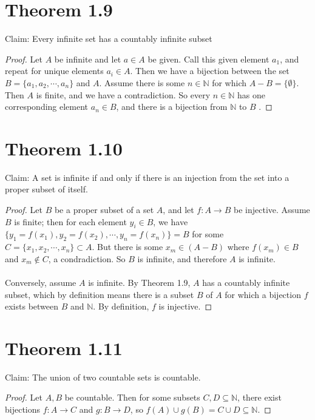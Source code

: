 \documentclass{article}
\begin{document}
\section*{Theorem 1.9}

Claim: Every infinite set has a countably infinite subset 

\begin{proof}
    Let $A$ be infinite and let $a \in A$ be given.  Call this given element 
    $a_1$, and repeat for unique elements $a_i \in A$.  Then we have a bijection 
    between the set $B = \{ a_1, a_2, \cdots, a_n \}$ and $A$.  Assume there is some 
    $n \in \mathbb{N}$ for which $A - B = \{ \emptyset \}$.  
    Then $A$ is finite, and we have a contradiction.  So every $n \in \mathbb{N}$ 
    has one corresponding element $a_n \in B$, and there is a bijection from $\mathbb{N}$ to $B$ .  
\end{proof}

\section*{Theorem 1.10}

Claim: A set is infinite if and only if there is an injection from the set into a 
proper subset of itself. 

\begin{proof}
    Let $B$ be a proper subset of a set $A$, and let $f:A \rightarrow B$ be injective.  
    Assume $B$ is finite; then for each 
    element $y_i \in B$, we have $\{ y_1 = f(x_1), y_2 = f(x_2), \cdots, y_n = f(x_n) \} = B$ 
    for some $C = \{ x_1, x_2, \cdots, x_n \} \subset A$.  But there is some $x_m \in (A-B)$ 
    where $f(x_m) \in B$ and $x_m \notin C$, a condradiction.  So $B$ is infinite, and 
    therefore $A$ is infinite.\\ 
    \\ 
    Conversely, assume $A$ is infinite.  By Theorem 1.9, $A$ has a countably infinite subset, 
    which by definition means there is a subset $B$ of $A$ for which a bijection $f$ exists 
    between $B$ and $\mathbb{N}$.  By definition, $f$ is injective.
\end{proof}

\section*{Theorem 1.11} 

Claim: The union of two countable sets is countable. 

\begin{proof}
    Let $A, B$ be countable.  Then for some subsets $C, D \subseteq \mathbb{N}$, 
    there exist bijections $f: A \rightarrow C$ 
    and $g: B \rightarrow D$, so $f(A) \cup g(B) = C \cup D \subseteq \mathbb{N}$.
\end{proof}
\end{document}
